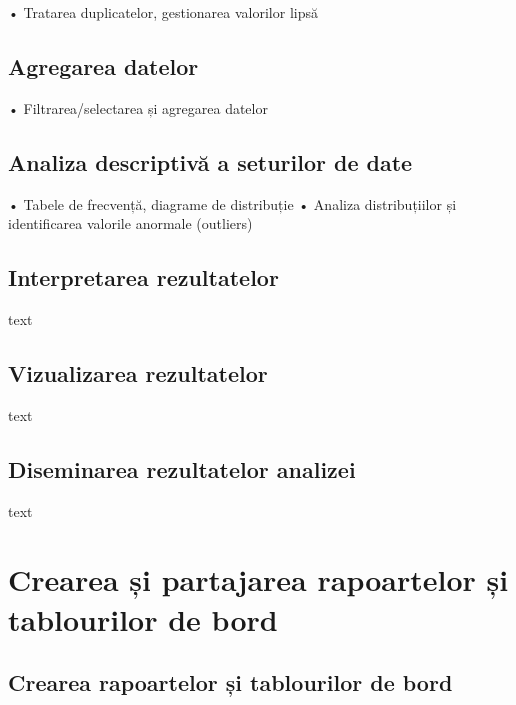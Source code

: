 \documentclass[
  11pt,
  b5paper,
  nottoc]{book}
\begin{document}
• Tratarea duplicatelor, gestionarea valorilor lipsă

\hypertarget{agregarea-datelor}{%
\section{Agregarea datelor}\label{agregarea-datelor}}

• Filtrarea/selectarea și agregarea datelor

\hypertarget{analiza-descriptivux103-a-seturilor-de-date}{%
\section{Analiza descriptivă a seturilor de
date}\label{analiza-descriptivux103-a-seturilor-de-date}}

• Tabele de frecvență, diagrame de distribuție • Analiza distribuțiilor
și identificarea valorile anormale (outliers)

\hypertarget{interpretarea-rezultatelor}{%
\section{Interpretarea rezultatelor}\label{interpretarea-rezultatelor}}

text

\hypertarget{vizualizarea-rezultatelor}{%
\section{Vizualizarea rezultatelor}\label{vizualizarea-rezultatelor}}

text

\hypertarget{diseminarea-rezultatelor-analizei}{%
\section{Diseminarea rezultatelor
analizei}\label{diseminarea-rezultatelor-analizei}}

text


\hypertarget{cap6}{%
\chapter{Crearea și partajarea rapoartelor și tablourilor de
bord}\label{cap6}}

\hypertarget{crearea-rapoartelor-ux219i-tablourilor-de-bord}{%
\section{Crearea rapoartelor și tablourilor de
bord}\label{crearea-rapoartelor-ux219i-tablourilor-de-bord}}
\end{document}
